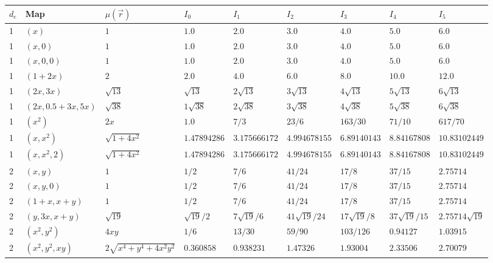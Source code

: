 \begin{landscape}

\begin{center}
\begin{tabular}{ | l | l | l | l | l | l | l | l | l |}
  \hline
  $d_e$ & Map & $\mu(\vec{r})$ & $I_0$ & $I_1$ & $I_2$ & $I_3$ & $I_4$ & $I_5$ \\ \hline
  1 & $(x)$                & $1$ & $1.0$ & $2.0$ & $3.0$ & $4.0$ & $5.0$ & $6.0$ \\ \hline
  1 & $(x,0)$              & $1$ & $1.0$ & $2.0$ & $3.0$ & $4.0$ & $5.0$ & $6.0$ \\ \hline
  1 & $(x,0,0)$            & $1$ & $1.0$ & $2.0$ & $3.0$ & $4.0$ & $5.0$ & $6.0$ \\ \hline
  1 & $(1+2x)$             & $2$ & $2.0$ & $4.0$ & $6.0$ & $8.0$ & $10.0$ & $12.0$ \\ \hline
  1 & $(2x,3x)$            & $\sqrt{13}$ & $\sqrt{13}$ & $2\sqrt{13}$ & $3\sqrt{13}$ & $4\sqrt{13}$ & $5\sqrt{13}$ & $6\sqrt{13}$ \\ \hline
  1 & $(2x,0.5+3x,5x)$     & $\sqrt{38}$ & $1\sqrt{38}$ & $2\sqrt{38}$ & $3\sqrt{38}$ & $4\sqrt{38}$ & $5\sqrt{38}$ & $6\sqrt{38}$ \\ \hline
  1 & $(x^2)$              & $2x$ & $1.0$ & $7/3$ & $23/6$ & $163/30$ & $71/10$ & $617/70$ \\ \hline
  1 & $(x,x^2)$            & $\sqrt{1 + 4x^2}$ & $1.47894286$ & $3.175666172$ & $4.994678155$ & $6.89140143$ & $8.84167808$ & $10.83102449$ \\ \hline
  1 & $(x,x^2,2)$          & $\sqrt{1 + 4x^2}$ & $1.47894286$ & $3.175666172$ & $4.994678155$ & $6.89140143$ & $8.84167808$ & $10.83102449$ \\ \hline
  2 & $(x,y)$              & $1$ & $1/2$ & $7/6$ & $41/24$ & $17/8$ & $37/15$ & $2.75714$ \\ \hline
  2 & $(x,y,0)$            & $1$ & $1/2$ & $7/6$ & $41/24$ & $17/8$ & $37/15$ & $2.75714$ \\ \hline
  2 & $(1+x,x+y)$          & $1$ & $1/2$ & $7/6$ & $41/24$ & $17/8$ & $37/15$ & $2.75714$ \\ \hline
  2 & $(y,3x,x+y)$         & $\sqrt{19}$ & $\sqrt{19}/2$ & $7\sqrt{19}/6$ & $41\sqrt{19}/24$ & $17\sqrt{19}/8$ & $37\sqrt{19}/15$ & $2.75714 \sqrt{19}$ \\ \hline
  2 & $(x^2,y^2)$          & $4xy$ & $1/6$ & $13/30$ & $59/90$ & $103/126$ & $0.94127$ & $1.03915$ \\ \hline
  2 & $(x^2,y^2,xy)$       & $2\sqrt{x^4+y^4+4x^2 y^2}$ & $0.360858$ & $0.938231$ & $1.47326$ & $1.93004$ & $2.33506$ & $2.70079$ \\ \hline

\end{tabular}
\end{center}
\end{landscape}
